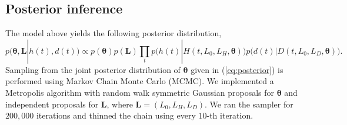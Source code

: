 \documentclass[11pt]{article}
\newcommand{\bL}{\mathbf{L}}
\newcommand{\btheta}{\boldsymbol{\theta}}
\newcommand{\comments}[1]{[\textcolor{red}{#1}]}
\begin{document}


\subsection{Posterior inference} 

The model above yields the following posterior distribution,
\begin{equation}
p(\btheta, \bL | h(t), d(t)) \propto p(\btheta) p(\bL)
							 \prod_t p\big(h(t)| H(t, L_0, L_H, \btheta)\big)
							         p\big(d(t)| D(t, L_0, L_D, \btheta)\big).
\label{eq:posterior}
\end{equation}
Sampling from the joint posterior distribution of $\btheta$ given in (\ref{eq:posterior}) is performed using Markov Chain Monte Carlo (MCMC). We implemented a Metropolis algorithm with random walk symmetric Gaussian proposals for $\btheta$ and independent proposals for $\bL$, where $\bL = (L_0, L_H, L_D)$. We ran the sampler for $200,000$ iterations and thinned the chain using every $10$-th iteration.
\end{document}
